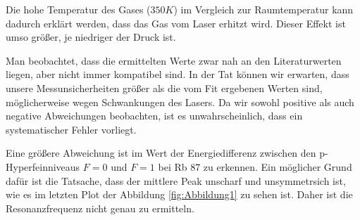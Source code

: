 \documentclass[a4paper,parskip]{scrartcl}
\begin{document}
Die hohe Temperatur des Gases ($350K$) im Vergleich zur Raumtemperatur kann dadurch erklärt werden, dass das Gas vom Laser erhitzt wird. Dieser Effekt ist umso größer, je niedriger der Druck ist.

Man beobachtet, dass die ermittelten Werte zwar nah an den Literaturwerten liegen, aber nicht immer kompatibel sind. In der Tat können wir erwarten, dass unsere Messunsicherheiten größer als die vom Fit ergebenen Werten sind, möglicherweise wegen Schwankungen des Lasers. Da wir sowohl positive als auch negative Abweichungen beobachten, ist es unwahrscheinlich, dass ein systematischer Fehler vorliegt.

Eine größere Abweichung ist im Wert der Energiedifferenz zwischen den p-Hyperfeinniveaus $F=0$ und $F=1$ bei Rb 87 zu erkennen. Ein möglicher Grund dafür ist die Tatsache, dass der mittlere Peak unscharf und unsymmetrsich ist, wie es im letzten Plot der Abbildung \ref{fig:Abbildung1} zu sehen ist. Daher ist die Resonanzfrequenz nicht genau zu ermitteln.

\newpage


\end{document}
